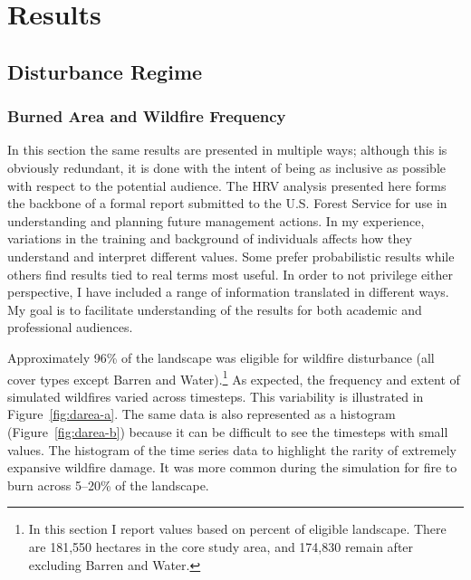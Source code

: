 \section{Results}
\label{sec:hrvresults}
\subsection{Disturbance Regime}

\subsubsection*{Burned Area and Wildfire Frequency}


In this section the same results are presented in multiple ways; although this is obviously redundant, it is done with the intent of being as inclusive as possible with respect to the potential audience. The HRV analysis presented here forms the backbone of a formal report submitted to the U.S. Forest Service for use in understanding and planning future management actions. In my experience, variations in the training and background of individuals affects how they understand and interpret different values. Some prefer probabilistic results while others find results tied to real terms most useful. In order to not privilege either perspective, I have included a range of information translated in different ways. My goal is to facilitate understanding of the results for both academic and professional audiences.

Approximately 96\% of the landscape was eligible for wildfire disturbance (all cover types except Barren and Water).\footnote{In this section I report values based on percent of eligible landscape. There are 181,550 hectares in the core study area, and 174,830 remain after excluding Barren and Water.} As expected, the frequency and extent of simulated wildfires varied across timesteps. This variability is illustrated in Figure~\ref{fig:darea-a}. The same data is also represented as a histogram (Figure~\ref{fig:darea-b}) because it can be difficult to see the timesteps with small values. The histogram of the time series data to highlight the rarity of extremely expansive wildfire damage. It was more common during the simulation for fire to burn across 5--20\% of the landscape.

